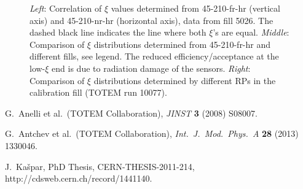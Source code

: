 \documentclass{article}
\def\etal{et al.}
\def\Name#1{#1, }
\def\Review#1#2#3#4{{\it #1} {\bf #2} (#3) #4}
\begin{document}
\begin{figure}[h!]
\begin{center}
\hskip-15mm
\caption{%
{\it Left}: Correlation of $\xi$ values determined from 45-210-fr-hr (vertical axis) and 45-210-nr-hr (horizontal axis), data from fill 5026. The dashed black line indicates the line where both $\xi$'s are equal.
\hfil\break
{\it Middle}: Comparison of $\xi$ distributions determined from 45-210-fr-hr and different fills, see legend. The reduced efficiency/acceptance at the low-$\xi$ end is due to radiation damage of the sensors.
\hfil\break
{\it Right}: Comparison of $\xi$ distributions determined by different RPs in the calibration fill (TOTEM run 10077).
}
\label{fig:al_opt_val}
\end{center}
\end{figure}




\begin{thebibliography}{99}

	\Name{G.~Anelli \etal{}~(TOTEM Collaboration)}
	\Review{JINST}{3}{2008}{S08007}.

	\Name{G.~Antchev \etal{}~(TOTEM Collaboration)}
	\Review{Int.~J.~Mod.~Phys.~A}{28}{2013}{1330046}.

	\Name{J.~Ka\v spar}
	PhD Thesis, CERN-THESIS-2011-214,
	{http://cdsweb.cern.ch/record/1441140}.

\end{thebibliography}
\end{document}
